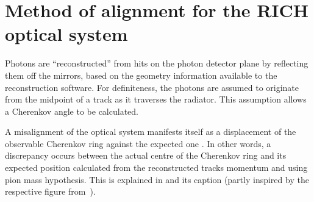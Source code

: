 \section{Method of alignment for the RICH optical system}
\label{sec:MirrorAlignmentMethod}

Photons are ``reconstructed''  from hits on the photon detector plane by
reflecting  them off the \rich mirrors, based on the \rich geometry information
available to the \lhcb reconstruction software. For definiteness, the photons
are assumed to originate from the midpoint of a track as it traverses the \rich
radiator. This assumption allows a Cherenkov angle to be calculated.

A misalignment of the \lhcb \rich optical system manifests itself as a
displacement of the observable Cherenkov ring against the expected one
\cite{Papanestis:2008zz, Baldini:2006ed}. In other words, a discrepancy occurs
between the actual centre of the Cherenkov ring and its expected position
calculated from the reconstructed tracks momentum and using pion mass
hypothesis.  This is explained in  and its
caption (partly inspired by the respective figure from~\cite{Gorisek:1999td}).
